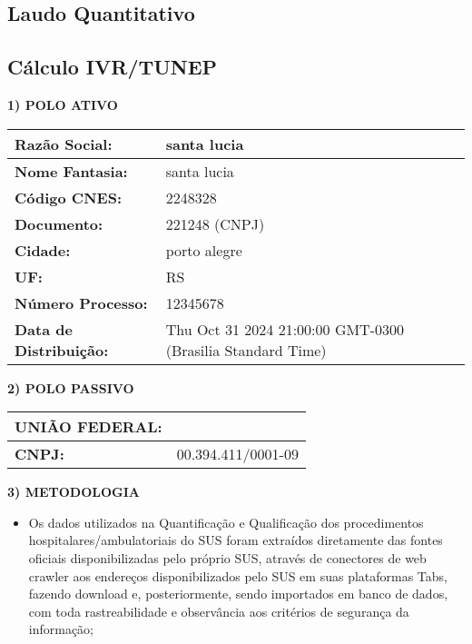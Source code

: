\documentclass{article}
\begin{document}
      
      \pagestyle{empty}
      
      \begin{landscape}
          
          \section*{Laudo Quantitativo}
          \subsection*{Cálculo IVR/TUNEP}

    \textbf{1) POLO ATIVO}

    \begin{tabular}{l l}
    \hline
    \textbf{Razão Social:} & santa lucia \\
    \hline
    \textbf{Nome Fantasia:} & santa lucia \\
    \hline
    \textbf{Código CNES:} & 2248328 \\
    \hline
    \textbf{Documento:} & 221248 (CNPJ) \\
    \hline
    \textbf{Cidade:} & porto alegre \\
    \hline
    \textbf{UF:} & RS \\
    \hline
    \textbf{Número Processo:} & 12345678 \\
    \hline
    \textbf{Data de Distribuição:} & Thu Oct 31 2024 21:00:00 GMT-0300 (Brasilia Standard Time) \\
    \hline
    \end{tabular}

    \vspace{10mm}

    \textbf{2) POLO PASSIVO}

    \begin{tabular}{l l}
    \hline
    \textbf{UNIÃO FEDERAL:} & \\
    \hline
    \textbf{CNPJ:} & 00.394.411/0001-09 \\
    \hline
    \end{tabular}

    \vspace{10mm}

    \textbf{3) METODOLOGIA}

    \begin{itemize}
    \item Os dados utilizados na Quantificação e Qualificação dos procedimentos hospitalares/ambulatoriais do SUS foram extraídos diretamente das fontes oficiais disponibilizadas pelo próprio SUS, através de conectores de web crawler aos endereços disponibilizados pelo SUS em suas plataformas Tabs, fazendo download e, posteriormente, sendo importados em banco de dados, com toda rastreabilidade e observância aos critérios de segurança da informação;


\end{itemize}
\end{landscape}
\end{document}
